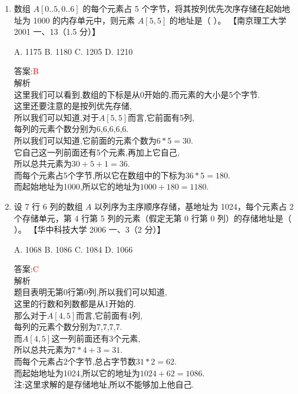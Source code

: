 \documentclass[lang=cn,newtx,10pt,scheme=chinese]{../elegantbook}
\begin{document}
\begin{enumerate}
    \item 数组 $A[0..5, 0..6]$ 的每个元素占 5 个字节，将其按列优先次序存储在起始地址为 1000 的内存单元中，则元素 $A[5,5]$ 的地址是（ ）。  
    【南京理工大学 2001 一、13（1.5 分）】 

    A. 1175 \quad B. 1180 \quad C. 1205 \quad D. 1210  

    答案:\textcolor{red}{B}\\
    解析\\
    这里我们可以看到,数组的下标是从0开始的,而元素的大小是5个字节.\\
    这里还要注意的是按列优先存储,\\
    所以我们可以知道,对于$A[5,5]$而言,它前面有5列,\\
    每列的元素个数分别为6,6,6,6,6.\\
    所以我们可以知道,它前面的元素个数为$6*5=30$.\\
    它自己这一列前面还有5个元素,再加上它自己,\\
    所以总共元素为$30+5+1=36$.\\
    而每个元素占5个字节,所以它在数组中的下标为$36*5=180$.\\
    而起始地址为1000,所以它的地址为$1000+180=1180$.\\

    \item 设 7 行 6 列的数组 $A$ 以列序为主序顺序存储，基地址为 1024，每个元素占 2 个存储单元，第 4 行第 5 列的元素（假定无第 0 行第 0 列）的存储地址是（ ）。  
    【华中科技大学 2006 一、3（2 分）】 

    A. 1068 \quad B. 1086 \quad C. 1084 \quad D. 1066  

    答案:\textcolor{red}{C}\\
    解析\\
    题目表明无第0行第0列,所以我们可以知道,\\
    这里的行数和列数都是从1开始的.\\
    那么对于$A[4,5]$而言,它前面有4列,\\
    每列的元素个数分别为7,7,7,7.\\
    而$A[4,5]$这一列前面还有3个元素,\\
    
    所以总共元素为$7*4+3=31$.\\
    而每个元素占2个字节,总占字节数$31*2=62$.\\
    而起始地址为1024,所以它的地址为$1024+62=1086$.\\

    注:这里求解的是存储地址,所以不能够加上他自己.\\




\end{enumerate}
\end{document}

